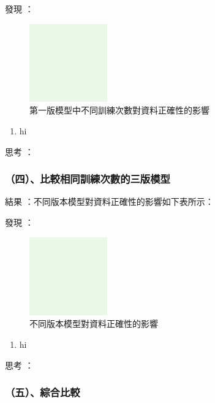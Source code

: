 \documentclass[8pt,a4paper,MingLiU,UTF8]{article}
\def\xeCJKembold{0.4}
\def\saveCJKnode{\dimen255\lastkern}
\def\restoreCJKnode{\kern-\dimen255\kern\dimen255}
\let\CJKoldsymbol\CJKsymbol
\let\CJKoldpunctsymbol\CJKpunctsymbol
\def\CJKfakeboldsymbol#1{%
	\special{pdf:literal direct 2 Tr \xeCJKembold\space w}%
	\CJKoldsymbol{#1}%
	\saveCJKnode
	\special{pdf:literal direct 0 Tr}%
	\restoreCJKnode}
\def\CJKfakeboldpunctsymbol#1{%
	\special{pdf:literal direct 2 Tr \xeCJKembold\space w}%
	\CJKoldpunctsymbol{#1}%
	\saveCJKnode
	\special{pdf:literal direct 0 Tr}%
	\restoreCJKnode}
\newcommand\CJKfakebold[1]{%
	\let\CJKsymbol\CJKfakeboldsymbol
	\let\CJKpunctsymbol\CJKfakeboldpunctsymbol
	#1%
	\let\CJKsymbol\CJKoldsymbol
	\let\CJKpunctsymbol\CJKoldpunctsymbol}
\begin{document}
	\CJKfakebold{發現}：
	\begin{figure}
		\centering
		\includegraphics[width=0.3\textwidth]{dummy}
		\caption{第一版模型中不同訓練次數對資料正確性的影響}
	\end{figure}
	\begin{enumerate}
		\item hi
	\end{enumerate}
	
	\CJKfakebold{思考}：
	
	\subsubsection{（四）、比較相同訓練次數的三版模型}
		\CJKfakebold{結果}：不同版本模型對資料正確性的影響如下表所示：
	
	\CJKfakebold{發現}：
	\begin{figure}
		\centering
		\includegraphics[width=0.3\textwidth]{dummy}
		\caption{不同版本模型對資料正確性的影響}
	\end{figure}
	\begin{enumerate}
		\item hi
	\end{enumerate}
	
	\CJKfakebold{思考}：
	
	\subsubsection{（五）、綜合比較}
\end{document}
